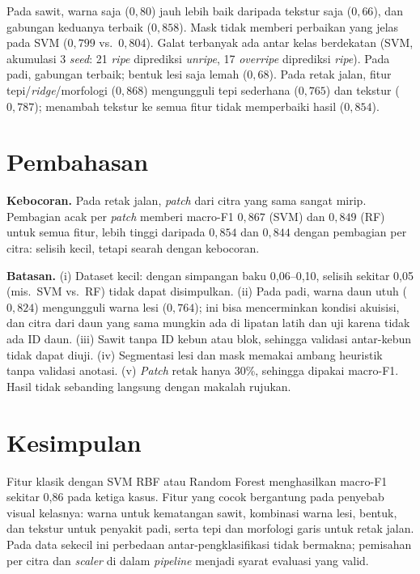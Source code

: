 \documentclass[conference]{IEEEtran}
\begin{document}
Pada sawit, warna saja ($0{,}80$) jauh lebih baik daripada tekstur saja
($0{,}66$), dan gabungan keduanya terbaik ($0{,}858$). Mask tidak memberi
perbaikan yang jelas pada SVM ($0{,}799$ vs.\ $0{,}804$). Galat terbanyak ada
antar kelas berdekatan (SVM, akumulasi 3 \emph{seed}: 21 \emph{ripe} diprediksi
\emph{unripe}, 17 \emph{overripe} diprediksi \emph{ripe}).
Pada padi, gabungan terbaik; bentuk lesi saja lemah ($0{,}68$). Pada retak jalan, fitur tepi/\emph{ridge}/morfologi ($0{,}868$) mengungguli
tepi sederhana ($0{,}765$) dan tekstur ($0{,}787$); menambah tekstur ke semua
fitur tidak memperbaiki hasil ($0{,}854$).

\section{Pembahasan}
\textbf{Kebocoran.} Pada retak jalan, \emph{patch} dari citra yang sama sangat
mirip. Pembagian acak per \emph{patch} memberi macro-F1 $0{,}867$ (SVM) dan
$0{,}849$ (RF) untuk semua fitur, lebih tinggi daripada $0{,}854$ dan $0{,}844$
dengan pembagian per citra: selisih kecil, tetapi searah dengan kebocoran.

\textbf{Batasan.} (i) Dataset kecil: dengan simpangan baku 0,06--0,10, selisih sekitar 0,05
(mis.\ SVM vs.\ RF) tidak dapat disimpulkan. (ii) Pada padi, warna daun utuh ($0{,}824$) mengungguli warna lesi
($0{,}764$); ini bisa mencerminkan kondisi akuisisi, dan citra dari daun yang sama
mungkin ada di lipatan latih dan uji karena tidak ada ID daun. (iii) Sawit tanpa ID kebun atau blok, sehingga validasi antar-kebun
tidak dapat diuji. (iv) Segmentasi lesi dan mask memakai ambang heuristik tanpa validasi
anotasi. (v) \emph{Patch} retak hanya 30\%, sehingga dipakai macro-F1. Hasil
tidak sebanding langsung dengan makalah rujukan.

\section{Kesimpulan}
Fitur klasik dengan SVM RBF atau Random Forest menghasilkan macro-F1 sekitar
0,86 pada ketiga kasus. Fitur yang cocok bergantung pada penyebab visual
kelasnya: warna untuk kematangan sawit, kombinasi warna lesi, bentuk, dan tekstur
untuk penyakit padi, serta tepi dan morfologi garis untuk retak jalan. Pada data sekecil ini perbedaan antar-pengklasifikasi tidak bermakna;
pemisahan per citra dan \emph{scaler} di dalam \emph{pipeline} menjadi syarat
evaluasi yang valid.
\end{document}

